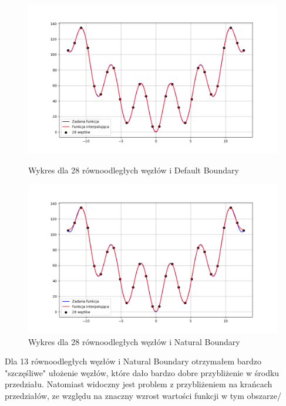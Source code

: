 \documentclass{article}
\begin{document}
\begin{figure}[H]
  \begin{minipage}[b]{0.49\textwidth}
    \includegraphics[width=\textwidth]{img23_n=28.png}
    \caption{Wykres dla 28 równoodległych węzłów i Default Boundary}
  \end{minipage}
  \hfill
  \begin{minipage}[b]{0.49\textwidth}
    \includegraphics[width=\textwidth]{img24_n=28.png}
    \caption{Wykres dla 28 równoodległych węzłów i Natural Boundary}
  \end{minipage}
\end{figure}

Dla 13 równoodległych węzłów i Natural Boundary otrzymałem bardzo "szczęśliwe" ułożenie węzłów, które dało bardzo dobre przybliżenie w środku przedziału. Natomiast widoczny jest problem z przybliżeniem na krańcach przedziałów, ze względu na znaczny wzrost wartości funkcji w tym obszarze/
\end{document}
